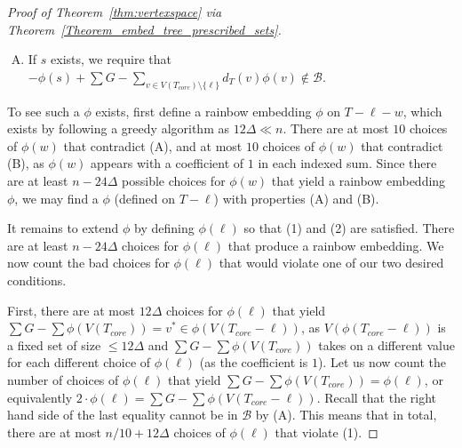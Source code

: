 \documentclass[a4paper,11pt,hidelinks]{amsart}
\theoremstyle{definition}
\begin{document}
\begin{proof}[Proof of Theorem~\ref{thm:vertexspace} via Theorem~\ref{Theorem_embed_tree_prescribed_sets}]
\begin{enumerate}[(A)]
\item If $s$ exists, we require that $ -\phi(s)+ \sum G - \sum_{v\in V(T_{core})\setminus \{\ell\}}d_T(v)\phi(v)\notin \mathcal{B}$. %
\end{enumerate}
To see such a $\phi$ exists, first define a rainbow embedding $\phi$ on ${T-\ell-w}$, which exists by following a greedy algorithm as $12\Delta\ll n$. There are at most $10$ choices of $\phi(w)$ that contradict (A), and at most $10$ choices of $\phi(w)$ that contradict (B), as $\phi(w)$ appears with a coefficient of $1$ in each indexed sum. Since there are at least $n-24\Delta$ possible choices for $\phi(w)$ that yield a rainbow embedding $\phi$, we may find a $\phi$ (defined on $T-\ell$) with properties (A) and (B).
\par It remains to extend $\phi$ by defining $\phi(\ell)$ so that (1) and (2) are satisfied. There are at least $n-24\Delta$ choices for $\phi(\ell)$ that produce a rainbow embedding. We now count the bad choices for $\phi(\ell)$ that would violate one of our two desired conditions.
\par First, there are at most $12\Delta$ choices for $\phi(\ell)$ that yield $\sum G - \sum \phi(V(T_{core}))=v^*\in \phi(V(T_{core}-\ell))$, as $V(\phi(T_{core}-\ell))$ is a fixed set of size $\leq 12\Delta$ and $\sum G - \sum \phi(V(T_{core}))$ takes on a different value for each different choice of $\phi(\ell)$ (as the coefficient is $1$). Let us now count the number of choices of $\phi(\ell)$ that yield $\sum G - \sum \phi(V(T_{core}))=\phi(\ell)$, or equivalently $2\cdot \phi(\ell) = \sum G - \sum \phi(V(T_{core}-\ell))$. Recall that the right hand side of the last equality cannot be in $\mathcal{B}$ by (A). This means that in total, there are at most $n/10 + 12\Delta$ choices of $\phi(\ell)$ that violate (1).

\end{proof}
\end{document}
